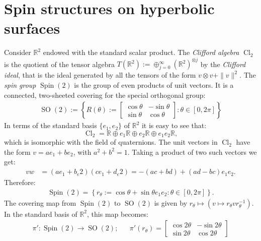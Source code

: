 \documentclass[12pt]{amsart}
\theoremstyle{definition}
\def\RR{{\mathbb R}}
\newcommand{\cl}{\operatorname{Cl}}
\newcommand{\so}{\operatorname{SO}}
\newcommand{\spin}{\operatorname{Spin}}
\begin{document}
\section{Spin structures on hyperbolic surfaces} 
Consider $\RR^2$ endowed with the standard scalar product. The \emph{Clifford algebra} $\cl_2$ is the quotient of the tensor algebra $T(\RR^2):=\oplus_{j=0}^{\infty} (\RR^2)^{\otimes j}$ by the \emph{Clifford ideal}, that is the ideal generated by all the tensors of the form $v\otimes v + \|v \|^2$. The \emph{spin group} $\spin(2)$ is the group of even products of unit vectors. It is a connected, two-sheeted covering for the special orthogonal group: 
\begin{align*}
\so(2):=\left\lbrace R(\theta):= \begin{bmatrix}
\cos \theta & -\sin \theta\\
\sin \theta & \cos \theta
\end{bmatrix}
:\theta\in [0,2\pi] \right\rbrace
\end{align*}
In terms of the standard basis $\{e_1,e_2 \}$ of $\RR^2$ it is easy to see that:
\[
\cl_2 = \RR \oplus e_1\RR \oplus e_2\RR \oplus e_1e_2\RR,
\]
which is isomorphic with the field of quaternions. The unit vectors in $\cl_2$ have the form $v=ae_1+be_2$, with $a^2+b^2=1$. Taking a product of two such vectors we get:
\begin{align*}
vw
&=
(ae_1+b_e2)(ce_1+d_e2)
=-(ac+bd) + (ad-bc)e_1e_2.
\end{align*}
Therefore:
\begin{align*}
\spin(2) = \left\lbrace r_{\theta}:= \cos \theta + \sin \theta e_1 e_2 : \theta \in [0,2\pi]  \right\rbrace.
\end{align*}
The covering map from $\spin(2)$ to $\so(2)$ is given by $r_{\theta} \mapsto \left( v \mapsto r_{\theta}vr_{\theta}^{-1} \right)$. In the standard basis of $\RR^2$, this map becomes:
\begin{align*}
\pi':\spin(2) \longrightarrow \so(2);
&&
\pi'(r_{\theta})=
\begin{bmatrix}
\cos 2\theta & -\sin 2\theta\\
\sin 2\theta & \cos 2\theta 
\end{bmatrix}
\end{align*}
\end{document}
